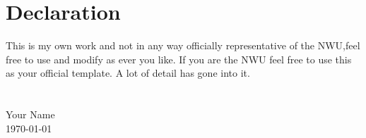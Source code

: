 \chapter*{Declaration}

This is my own work and not in any way officially representative of
the NWU,feel free to use and modify as ever you like. If you are the
NWU feel free to use this as your official template. A lot of detail
has gone into it.
\\\\
\hspace{0.5cm} \makebox[1.5in]{\hrulefill}
\\
Your Name
\\
\today
